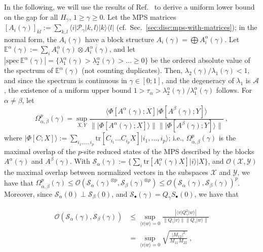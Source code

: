\documentclass[twocolumn,superscriptaddress,prb,linenumbers]{revtex4-1}
\newcommand{\ket}[1]{\vert#1\rangle}
\newcommand{\bra}[1]{\langle#1\vert}
\newcommand{\mc}[1]{\mathcal{#1}}
\newcommand{\tr}{\mathrm{tr}}
\begin{document}
In the following, we will use the results of
Ref.~
to derive a uniform lower bound on the gap for all $H_\gamma$,
$1\ge\gamma\ge0$. Let the MPS matrices $[A_i(\gamma)]_{kl}
    := \sum_{k,l}
    \bra{i}\mc P_\gamma\ket{k,l} \ket{k}\!\bra{l}$
(cf.~Sec.~\ref{sec:disc:mps-with-matrices});
in the normal form, the $A_i(\gamma)$ have a block structure
$A_i(\gamma)=\bigoplus A_i^\alpha(\gamma)$.
Let $\mathbb E^\alpha(\gamma) := \sum_i A_i^\alpha(\gamma)\otimes
    \overline{A_i^\alpha(\gamma)}$, and let $\left|\mathrm{spec}\,\mathbb
    E^\alpha(\gamma)\right|=
    \{\lambda_1^\alpha(\gamma)>\lambda_2^\alpha(\gamma)>\dots\ge0\}$ be the
ordered absolute value of the spectrum of $\mathbb E^\alpha(\gamma)$ (not
counting duplicates).  Then, $\lambda_2(\gamma)/\lambda_1(\gamma)<1$, and
since the spectrum is continuous in $\gamma\in[0;1]$, and the degeneracy
of $\lambda_1$ is $\mathcal A$,\cite{nachtergaele:degen-mps} the
existence of a uniform upper bound
$1>\tau_\alpha>\lambda_2^\alpha(\gamma)/\lambda_1^\alpha(\gamma)$ follows.
For $\alpha\ne\beta$, let
\[
    \Omega_{\alpha,\beta}^p(\gamma)=\sup_{X,Y}
    \frac{\big\langle\Phi[A^\alpha(\gamma);X]\big\vert\Phi[A^\beta(\gamma);Y]\big\rangle}{
        \big\|\ket{\Phi[A^\alpha(\gamma);X]}\big\|
        \big\|\ket{\Phi[A^\beta(\gamma);Y]}\big\|}\ ,
\]
where $\ket{\Phi[C;X]}:= \sum_{i_1,\dots,i_p}\tr[C_{i_1}\dots
        C_{i_p}X]\ket{i_1,\dots,i_p}$; i.e., $\Omega_{\alpha,\beta}^p(\gamma)$ is
the maximal overlap of the $p$-site reduced states of the MPS
described by the blocks $A^\alpha(\gamma)$ and $A^\beta(\gamma)$.
With $\mathcal
    S_\alpha(\gamma):=\{\sum_i\tr[A^\alpha_i(\gamma)X]\ket{i}|X\}$,
and $\mathcal O(\mathcal X,\mathcal
    Y)$ the maximal overlap between normalized vectors in the subspaces
$\mathcal X$ and $\mathcal Y$, we have that
$\Omega_{\alpha,\beta}^p(\gamma)
    \le \mathcal O(\mathcal S_\alpha(\gamma)^{\otimes p},\mathcal
    S_\beta(\gamma)^{\otimes p})
    \le \mathcal O(\mathcal S_\alpha(\gamma),\mathcal S_\beta(\gamma))^p$.
Moreover, since $\mathcal S_\alpha(0)\perp\mathcal S_\beta(0)$, and
$\mathcal S_{\bullet}(\gamma)=Q_\gamma S_{\bullet}(0)$, we have that
\begin{linenomath}
    \begin{align*}
        \mathcal O(\mathcal S_\alpha(\gamma),\mathcal S_\beta(\gamma))
         & \le
        \sup_{\bra{v}w\rangle=0}
        \frac{|\bra{v}Q_\gamma^2\ket{w}|}{
            \|Q_\gamma\ket{v}\|\|Q_\gamma\ket{w}\|}
        \\
         & =
        \sup_{\bra{v}w\rangle=0}
        \sqrt{\frac{|M_{12}|^2}{M_{11}M_{22}}}\ ,
    \end{align*}
\end{linenomath}
\end{document}
